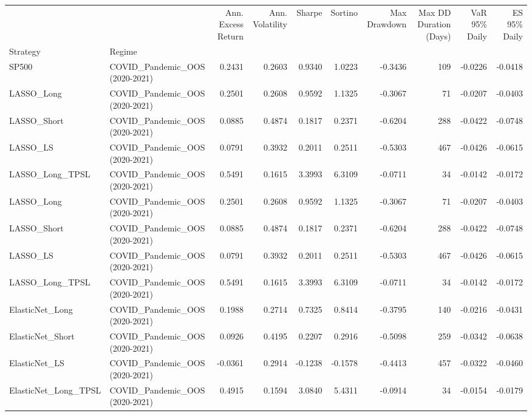 \begin{tabular}{llrrrrrrrr}
\toprule
 &  & Ann. Excess Return & Ann. Volatility & Sharpe & Sortino & Max Drawdown & Max DD Duration (Days) & VaR 95\% Daily & ES 95\% Daily \\
Strategy & Regime &  &  &  &  &  &  &  &  \\
\midrule
SP500 & COVID\_Pandemic\_OOS (2020-2021) & 0.2431 & 0.2603 & 0.9340 & 1.0223 & -0.3436 & 109 & -0.0226 & -0.0418 \\
\cline{1-10}
LASSO\_Long & COVID\_Pandemic\_OOS (2020-2021) & 0.2501 & 0.2608 & 0.9592 & 1.1325 & -0.3067 & 71 & -0.0207 & -0.0403 \\
\cline{1-10}
LASSO\_Short & COVID\_Pandemic\_OOS (2020-2021) & 0.0885 & 0.4874 & 0.1817 & 0.2371 & -0.6204 & 288 & -0.0422 & -0.0748 \\
\cline{1-10}
LASSO\_LS & COVID\_Pandemic\_OOS (2020-2021) & 0.0791 & 0.3932 & 0.2011 & 0.2511 & -0.5303 & 467 & -0.0426 & -0.0615 \\
\cline{1-10}
LASSO\_Long\_TPSL & COVID\_Pandemic\_OOS (2020-2021) & 0.5491 & 0.1615 & 3.3993 & 6.3109 & -0.0711 & 34 & -0.0142 & -0.0172 \\
\cline{1-10}
LASSO\_Long & COVID\_Pandemic\_OOS (2020-2021) & 0.2501 & 0.2608 & 0.9592 & 1.1325 & -0.3067 & 71 & -0.0207 & -0.0403 \\
\cline{1-10}
LASSO\_Short & COVID\_Pandemic\_OOS (2020-2021) & 0.0885 & 0.4874 & 0.1817 & 0.2371 & -0.6204 & 288 & -0.0422 & -0.0748 \\
\cline{1-10}
LASSO\_LS & COVID\_Pandemic\_OOS (2020-2021) & 0.0791 & 0.3932 & 0.2011 & 0.2511 & -0.5303 & 467 & -0.0426 & -0.0615 \\
\cline{1-10}
LASSO\_Long\_TPSL & COVID\_Pandemic\_OOS (2020-2021) & 0.5491 & 0.1615 & 3.3993 & 6.3109 & -0.0711 & 34 & -0.0142 & -0.0172 \\
\cline{1-10}
ElasticNet\_Long & COVID\_Pandemic\_OOS (2020-2021) & 0.1988 & 0.2714 & 0.7325 & 0.8414 & -0.3795 & 140 & -0.0216 & -0.0431 \\
\cline{1-10}
ElasticNet\_Short & COVID\_Pandemic\_OOS (2020-2021) & 0.0926 & 0.4195 & 0.2207 & 0.2916 & -0.5098 & 259 & -0.0342 & -0.0638 \\
\cline{1-10}
ElasticNet\_LS & COVID\_Pandemic\_OOS (2020-2021) & -0.0361 & 0.2914 & -0.1238 & -0.1578 & -0.4413 & 457 & -0.0322 & -0.0460 \\
\cline{1-10}
ElasticNet\_Long\_TPSL & COVID\_Pandemic\_OOS (2020-2021) & 0.4915 & 0.1594 & 3.0840 & 5.4311 & -0.0914 & 34 & -0.0154 & -0.0179 \\

\end{tabular}

